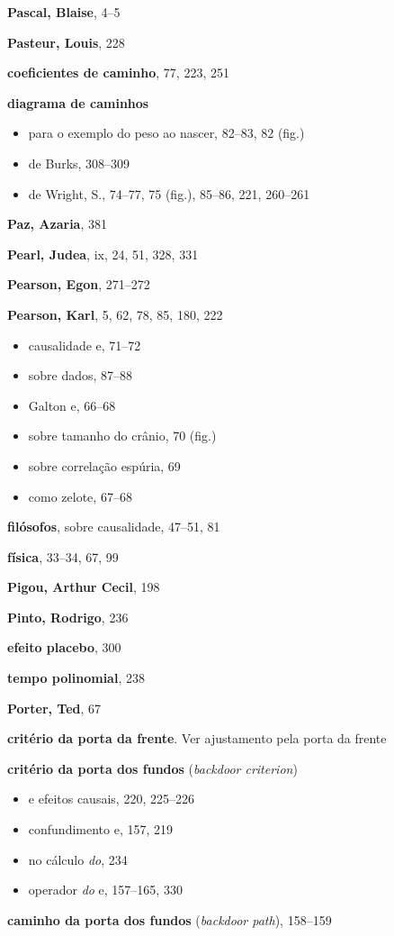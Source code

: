 \documentclass[11pt,a5paper,twoside]{book}
\begin{document}
\textbf{Pascal, Blaise}, 4–5

\textbf{Pasteur, Louis}, 228

\textbf{coeficientes de caminho}, 77, 223, 251

\textbf{diagrama de caminhos}

\begin{itemize}
\item para o exemplo do peso ao nascer, 82–83, 82 (fig.)
\item de Burks, 308–309
\item de Wright, S., 74–77, 75 (fig.), 85–86, 221, 260–261
\end{itemize}
\textbf{Paz, Azaria}, 381

\textbf{Pearl, Judea}, ix, 24, 51, 328, 331

\textbf{Pearson, Egon}, 271–272

\textbf{Pearson, Karl}, 5, 62, 78, 85, 180, 222

\begin{itemize}
\item causalidade e, 71–72
\item sobre dados, 87–88
\item Galton e, 66–68
\item sobre tamanho do crânio, 70 (fig.)
\item sobre correlação espúria, 69
\item como zelote, 67–68
\end{itemize}
\textbf{filósofos}, sobre causalidade, 47–51, 81

\textbf{física}, 33–34, 67, 99

\textbf{Pigou, Arthur Cecil}, 198

\textbf{Pinto, Rodrigo}, 236

\textbf{efeito placebo}, 300

\textbf{tempo polinomial}, 238

\textbf{Porter, Ted}, 67

\textbf{critério da porta da frente}. Ver ajustamento pela porta da frente

\textbf{critério da porta dos fundos} (\textit{backdoor criterion})

\begin{itemize}
\item e efeitos causais, 220, 225–226
\item confundimento e, 157, 219
\item no cálculo \textit{do}, 234
\item operador \textit{do} e, 157–165, 330
\end{itemize}
\textbf{caminho da porta dos fundos} (\textit{backdoor path}), 158–159
\end{document}
